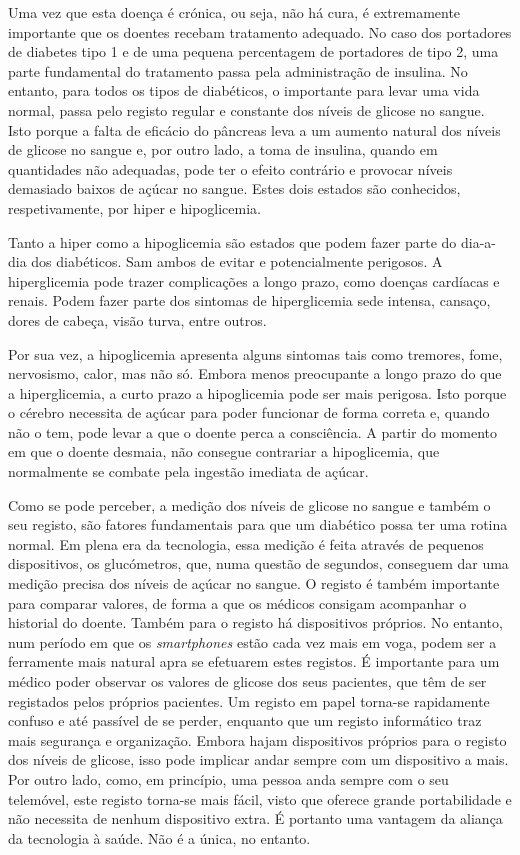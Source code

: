 Uma vez que esta doença é crónica, ou seja, não há cura, é extremamente importante que os doentes recebam tratamento adequado. No caso dos portadores de diabetes tipo 1 e de uma pequena percentagem de portadores de tipo 2, uma parte fundamental do tratamento passa pela administração de insulina. No entanto, para todos os tipos de diabéticos, o importante para levar uma vida normal, passa pelo registo regular e constante dos níveis de glicose no sangue. Isto porque a falta de eficácio do pâncreas leva a um aumento natural dos níveis de glicose no sangue e, por outro lado, a toma de insulina, quando em quantidades não adequadas, pode ter o efeito contrário e provocar níveis demasiado baixos de açúcar no sangue. Estes dois estados são conhecidos, respetivamente, por hiper e hipoglicemia.

Tanto a hiper como a hipoglicemia são estados que podem fazer parte do dia-a-dia dos diabéticos. Sam ambos de evitar e potencialmente perigosos. A hiperglicemia pode trazer complicações a longo prazo, como doenças cardíacas e renais. Podem fazer parte dos sintomas de hiperglicemia sede intensa, cansaço, dores de cabeça, visão turva, entre outros.

Por sua vez, a hipoglicemia apresenta alguns sintomas tais como tremores, fome, nervosismo, calor, mas não só. Embora menos preocupante a longo prazo do que a hiperglicemia, a curto prazo a hipoglicemia pode ser mais perigosa. Isto porque o cérebro necessita de açúcar para poder funcionar de forma correta e, quando não o tem, pode levar a que o doente perca a consciência. A partir do momento em que o doente desmaia, não consegue contrariar a hipoglicemia, que normalmente se combate pela ingestão imediata de açúcar.

Como se pode perceber, a medição dos níveis de glicose no sangue e também o seu registo, são fatores fundamentais para que um diabético possa ter uma rotina normal. Em plena era da tecnologia, essa medição é feita através de pequenos dispositivos, os glucómetros, que, numa questão de segundos, conseguem dar uma medição precisa dos níveis de açúcar no sangue. O registo é também importante para comparar valores, de forma a que os médicos consigam acompanhar o historial do doente. Também para o registo há dispositivos próprios. No entanto, num período em que os \textit{smartphones} estão cada vez mais em voga, podem ser a ferramente mais natural apra se efetuarem estes registos. É importante para um médico poder observar os valores de glicose dos seus pacientes, que têm de ser registados pelos próprios pacientes. Um registo em papel torna-se rapidamente confuso e até passível de se perder, enquanto que um registo informático traz mais segurança e organização. Embora hajam dispositivos próprios para o registo dos níveis de glicose, isso pode implicar andar sempre com um dispositivo a mais. Por outro lado, como, em princípio, uma pessoa anda sempre com o seu telemóvel, este registo torna-se mais fácil, visto que oferece grande portabilidade e não necessita de nenhum dispositivo extra. É portanto uma vantagem da aliança da tecnologia à saúde. Não é a única, no entanto.

